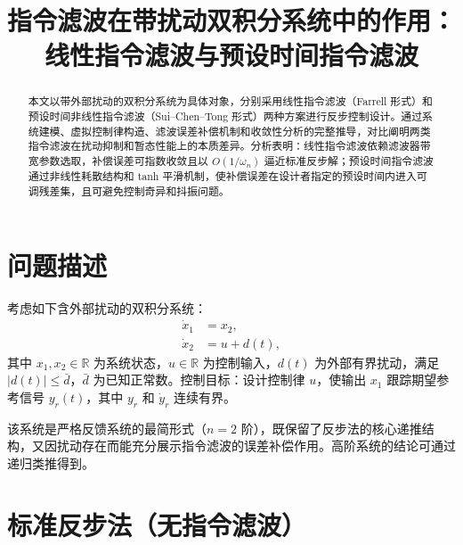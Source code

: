 \documentclass[UTF8,a4paper,11pt]{ctexart}
\title{指令滤波在带扰动双积分系统中的作用：线性指令滤波与预设时间指令滤波}
\author{}
\date{}
\begin{document}
\maketitle

\begin{abstract}
本文以带外部扰动的双积分系统为具体对象，分别采用线性指令滤波（Farrell 形式）和预设时间非线性指令滤波（Sui--Chen--Tong 形式）两种方案进行反步控制设计。通过系统建模、虚拟控制律构造、滤波误差补偿机制和收敛性分析的完整推导，对比阐明两类指令滤波在扰动抑制和暂态性能上的本质差异。分析表明：线性指令滤波依赖滤波器带宽参数选取，补偿误差可指数收敛且以 $O(1/\omega_n)$ 逼近标准反步解；预设时间指令滤波通过非线性耗散结构和 tanh 平滑机制，使补偿误差在设计者指定的预设时间内进入可调残差集，且可避免控制奇异和抖振问题。
\end{abstract}

\section{问题描述}

考虑如下含外部扰动的双积分系统：
\begin{equation}
\label{eq:plant}
\begin{aligned}
\dot{x}_1 &= x_2, \\
\dot{x}_2 &= u + d(t),
\end{aligned}
\end{equation}
其中 $x_1, x_2 \in \mathbb{R}$ 为系统状态，$u \in \mathbb{R}$ 为控制输入，$d(t)$ 为外部有界扰动，满足 $|d(t)| \leq \bar{d}$，$\bar{d}$ 为已知正常数。控制目标：设计控制律 $u$，使输出 $x_1$ 跟踪期望参考信号 $y_r(t)$，其中 $y_r$ 和 $\dot{y}_r$ 连续有界。

该系统是严格反馈系统的最简形式（$n=2$ 阶），既保留了反步法的核心递推结构，又因扰动存在而能充分展示指令滤波的误差补偿作用。高阶系统的结论可通过递归类推得到。

\section{标准反步法（无指令滤波）}
\end{document}
